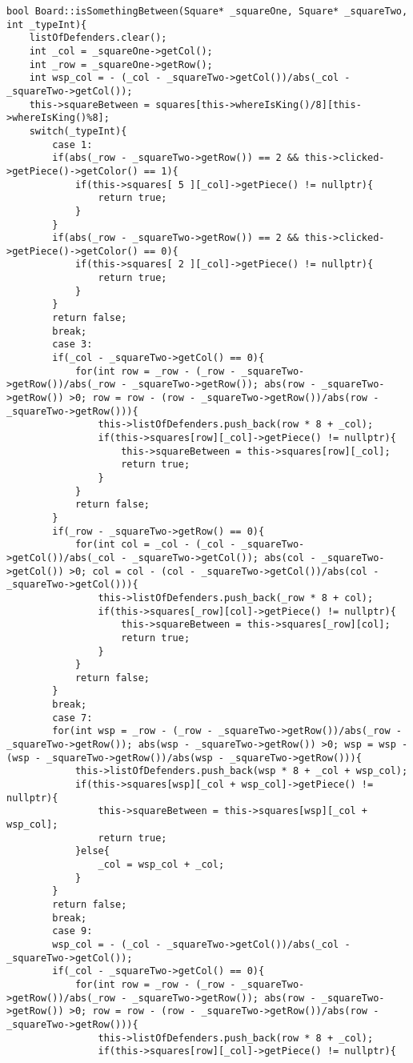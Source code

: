 \documentclass[]{report}
\begin{document}
\begin{flushleft}
\begin{lstlisting}
bool Board::isSomethingBetween(Square* _squareOne, Square* _squareTwo, int _typeInt){
	listOfDefenders.clear();
	int _col = _squareOne->getCol();
	int _row = _squareOne->getRow();
	int wsp_col = - (_col - _squareTwo->getCol())/abs(_col - _squareTwo->getCol());
	this->squareBetween = squares[this->whereIsKing()/8][this->whereIsKing()%8];
	switch(_typeInt){
		case 1:
		if(abs(_row - _squareTwo->getRow()) == 2 && this->clicked->getPiece()->getColor() == 1){
			if(this->squares[ 5 ][_col]->getPiece() != nullptr){
				return true;
			}
		}
		if(abs(_row - _squareTwo->getRow()) == 2 && this->clicked->getPiece()->getColor() == 0){
			if(this->squares[ 2 ][_col]->getPiece() != nullptr){
				return true;
			}
		}
		return false;
		break;
		case 3:
		if(_col - _squareTwo->getCol() == 0){
			for(int row = _row - (_row - _squareTwo->getRow())/abs(_row - _squareTwo->getRow()); abs(row - _squareTwo->getRow()) >0; row = row - (row - _squareTwo->getRow())/abs(row - _squareTwo->getRow())){
				this->listOfDefenders.push_back(row * 8 + _col);
				if(this->squares[row][_col]->getPiece() != nullptr){
					this->squareBetween = this->squares[row][_col];
					return true;
				}
			}
			return false;
		}
		if(_row - _squareTwo->getRow() == 0){
			for(int col = _col - (_col - _squareTwo->getCol())/abs(_col - _squareTwo->getCol()); abs(col - _squareTwo->getCol()) >0; col = col - (col - _squareTwo->getCol())/abs(col - _squareTwo->getCol())){
				this->listOfDefenders.push_back(_row * 8 + col);
				if(this->squares[_row][col]->getPiece() != nullptr){
					this->squareBetween = this->squares[_row][col];
					return true;
				}
			}
			return false;
		}
		break;
		case 7:
		for(int wsp = _row - (_row - _squareTwo->getRow())/abs(_row - _squareTwo->getRow()); abs(wsp - _squareTwo->getRow()) >0; wsp = wsp - (wsp - _squareTwo->getRow())/abs(wsp - _squareTwo->getRow())){
			this->listOfDefenders.push_back(wsp * 8 + _col + wsp_col);
			if(this->squares[wsp][_col + wsp_col]->getPiece() != nullptr){
				this->squareBetween = this->squares[wsp][_col + wsp_col];
				return true;
			}else{
				_col = wsp_col + _col;
			}
		}
		return false;
		break;
		case 9:
		wsp_col = - (_col - _squareTwo->getCol())/abs(_col - _squareTwo->getCol());
		if(_col - _squareTwo->getCol() == 0){
			for(int row = _row - (_row - _squareTwo->getRow())/abs(_row - _squareTwo->getRow()); abs(row - _squareTwo->getRow()) >0; row = row - (row - _squareTwo->getRow())/abs(row - _squareTwo->getRow())){
				this->listOfDefenders.push_back(row * 8 + _col);
				if(this->squares[row][_col]->getPiece() != nullptr){

\end{lstlisting}
\end{flushleft}
\end{document}

